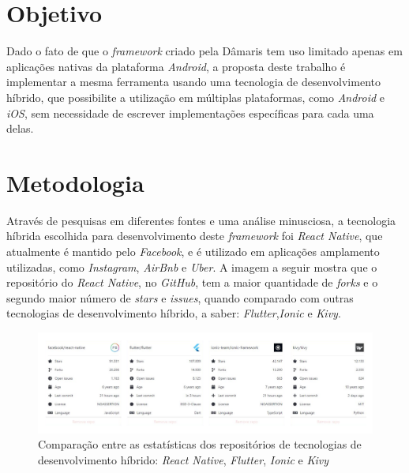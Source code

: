 \documentclass[
	12pt,				    %
	openright,			    %
	oneside,			    %
	a4paper,			    %
    sumario=tradicional,    %
	english,			    %
	brazil,				    %
	]{abntex2}              %
\begin{document}
\par

\chapter{Objetivo}\label{sec:objetivo}

Dado o fato de que o \textit{framework} criado pela Dâmaris tem uso limitado apenas em aplicações nativas da plataforma \textit{Android}, a proposta deste trabalho é implementar a mesma ferramenta usando uma tecnologia de desenvolvimento híbrido, que possibilite a utilização em múltiplas plataformas, como \textit{Android} e \textit{iOS}, sem necessidade de escrever implementações específicas para cada uma delas.

\chapter{Metodologia}\label{sec:metodologia}		

Através de pesquisas em diferentes fontes e uma análise minusciosa, a tecnologia híbrida escolhida para desenvolvimento deste \textit{framework} foi \textit{React Native}, que atualmente é mantido pelo \textit{Facebook}, e é utilizado em aplicações amplamento utilizadas, como \textit{Instagram}, \textit{AirBnb} e \textit{Uber}. A imagem a seguir mostra que o repositório do \textit{React Native}, no \textit{GitHub}, tem a maior quantidade de \textit{forks} e o segundo maior número de \textit{stars} e \textit{issues}, quando comparado com outras tecnologias de desenvolvimento híbrido, a saber: \textit{Flutter},\textit{Ionic} e \textit{Kivy}.

	\par

\begin{figure}[h]
	\begin{center}	
		\includegraphics[width=.9\linewidth]{github-compare.png}
	\end{center}
	\caption[GitHub Compare]{Comparação entre as estatísticas dos repositórios de tecnologias de desenvolvimento híbrido: \textit{React Native}, \textit{Flutter}, \textit{Ionic} e \textit{Kivy}}
	\label{fig:githubCompare}
\end{figure}
\end{document}
